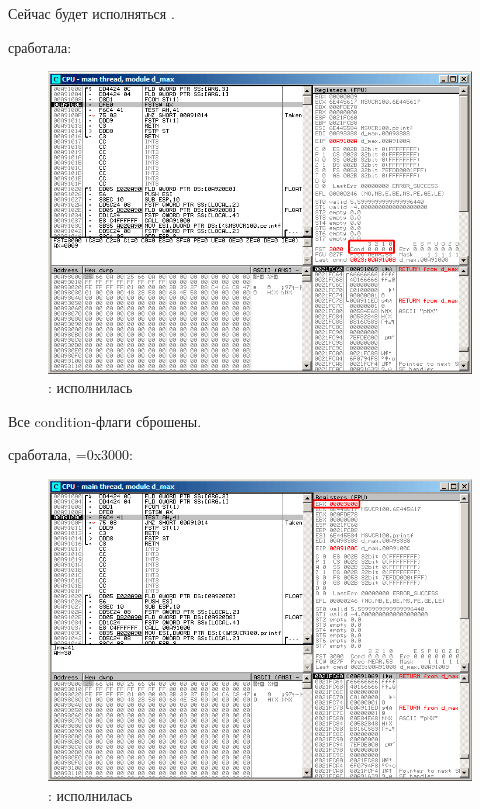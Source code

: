 Сейчас будет исполняться \FCOM.

\clearpage
\FCOM сработала:

\begin{figure}[H]
\centering
\includegraphics[scale=\FigScale]{patterns/12_FPU/3_comparison/x86/MSVC_Ox/olly2_2.png}
\caption{\olly: \FCOM исполнилась}
\label{fig:FPU_comparison_Ox_case2_olly2}
\end{figure}

Все condition-флаги сброшены.

\clearpage
\FNSTSW сработала, =0x3000:

\begin{figure}[H]
\centering
\includegraphics[scale=\FigScale]{patterns/12_FPU/3_comparison/x86/MSVC_Ox/olly2_3.png}
\caption{\olly: \FNSTSW исполнилась}
\label{fig:FPU_comparison_Ox_case2_olly3}
\end{figure}

